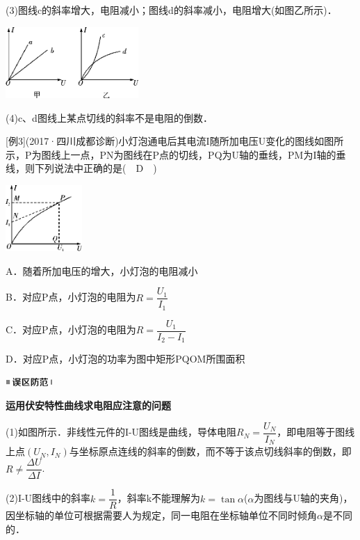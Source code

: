 (3)图线c的斜率增大，电阻减小；图线d的斜率减小，电阻增大(如图乙所示)．

\begin{center}\includegraphics[width=1.99028in,height=1.06597in]{media/image311.png}\end{center}

(4)c、d图线上某点切线的斜率不是电阻的倒数．

{[}例3{]}(2017·四川成都诊断)小灯泡通电后其电流I随所加电压U变化的图线如图所示，P为图线上一点，PN为图线在P点的切线，PQ为U轴的垂线，PM为I轴的垂线，则下列说法中正确的是(　D　)

\begin{center}\includegraphics[width=1.14167in,height=0.99028in]{media/image312.png}\end{center}

A．随着所加电压的增大，小灯泡的电阻减小

B．对应P点，小灯泡的电阻为$R=\dfrac{U_{1}}{I_{1}}$

C．对应P点，小灯泡的电阻为$R=\dfrac{U_{1}}{I_{2}-I_{1}}$

D．对应P点，小灯泡的功率为图中矩形PQOM所围面积

\begin{center}\includegraphics[width=0.70764in,height=0.12292in]{media/image34.png}\end{center}
\begin{center}
	\textbf{运用伏安特性曲线求电阻应注意的问题}
\end{center}

(1)如图所示．非线性元件的I-U图线是曲线，导体电阻$R_{N}=\dfrac{U_{N}}{I_{N}}$，即电阻等于图线上点$\left(U_{N}, I_{N}\right)$与坐标原点连线的斜率的倒数，而不等于该点切线斜率的倒数，即$R \neq \dfrac{\Delta U}{\Delta I}$.

(2)I-U图线中的斜率$k=\dfrac{1}{R}$，斜率k不能理解为$k=\tan \alpha$($\alpha$为图线与U轴的夹角)，因坐标轴的单位可根据需要人为规定，同一电阻在坐标轴单位不同时倾角$\alpha$是不同的．

